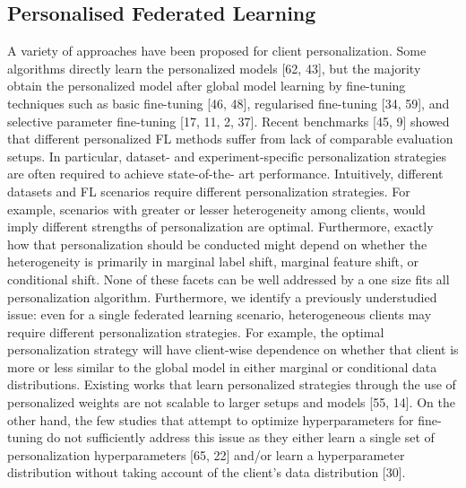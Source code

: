 \documentclass[withindex,glossary]{cam-thesis}
\begin{document}
\subsection{Personalised Federated Learning}
A variety of approaches have been proposed for client personalization. Some algorithms directly learn the personalized models [62, 43], but the majority obtain the personalized model after global model learning by fine-tuning techniques such as basic fine-tuning [46, 48], regularised fine-tuning [34, 59], and selective parameter fine-tuning [17, 11, 2, 37]. Recent benchmarks [45, 9] showed that different personalized FL methods suffer from lack of comparable evaluation setups. In particular, dataset- and experiment-specific personalization strategies are often required to achieve state-of-the- art performance. Intuitively, different datasets and FL scenarios require different personalization strategies. For example, scenarios with greater or lesser heterogeneity among clients, would imply different strengths of personalization are optimal. Furthermore, exactly how that personalization should be conducted might depend on whether the heterogeneity is primarily in marginal label shift, marginal feature shift, or conditional shift. None of these facets can be well addressed by a one size fits all personalization algorithm. Furthermore, we identify a previously understudied issue: even for a single federated learning scenario, heterogeneous clients may require different personalization strategies. For example, the optimal personalization strategy will have client-wise dependence on whether that client is more or less similar to the global model in either marginal or conditional data distributions. Existing works that learn personalized strategies through the use of personalized weights are not scalable to larger setups and models [55, 14]. On the other hand, the few studies that attempt to optimize hyperparameters for fine-tuning do not sufficiently address this issue as they either learn a single set of personalization hyperparameters [65, 22] and/or learn a hyperparameter distribution without taking account of the client’s data distribution [30].
\end{document}
